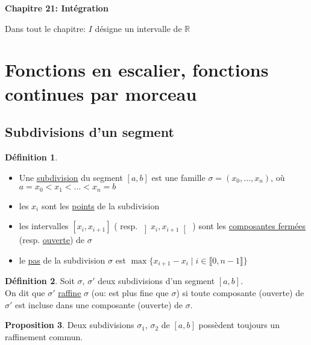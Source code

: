 \documentclass[10pt,a4paper]{article}
\theoremstyle{definition}
\newtheorem{proposition}{Proposition}[section]
\newtheorem{definition}[proposition]{Définition}
\begin{document}
\renewcommand{\labelitemi}{$*$}
\begin{center}
{\Large \textbf{Chapitre 21: Intégration}}
\end{center}
Dans tout le chapitre: $I$ désigne un intervalle de $\mathbb{R}$

\section{Fonctions en escalier, fonctions continues par morceau}
\subsection{Subdivisions d'un segment}
\begin{definition}
\hfill
\begin{itemize}
\item Une \uline{subdivision} du segment $[a, b]$ est une famille $\sigma = (x_{0}, ... , x_{n})$, où \\ $a = x_{0} < x_{1} < ... < x_{n} = b$
\item les $x_{i}$ sont les \uline{points} de la subdivision
\item les intervalles $\left[x_{i}, x_{i+1}\right]$ ( resp. $\left]x_{i}, x_{i+1}\right[$ ) sont les \uline{composantes fermées} (resp. \uline{ouverte}) de $\sigma$
\item le \uline{pas} de la subdivision $\sigma$ est $\max{\{x_{i+1} - x_{i} \mid i \in \llbracket 0, n-1 \rrbracket\}}$
\end{itemize}
\end{definition}
\begin{definition}
Soit $\sigma$, $\sigma'$ deux subdivisions d'un segment $[a, b]$. \\
On dit que $\sigma'$ \uline{raffine} $\sigma$ (ou: est plus fine que $\sigma$) si toute composante (ouverte) de $\sigma'$ est incluse dans une composante (ouverte) de $\sigma$.
\end{definition}
\begin{proposition}
Deux subdivisions $\sigma_{1}$, $\sigma_{2}$ de $[a, b]$ possèdent toujours un raffinement commun.
\end{proposition}
\end{document}
